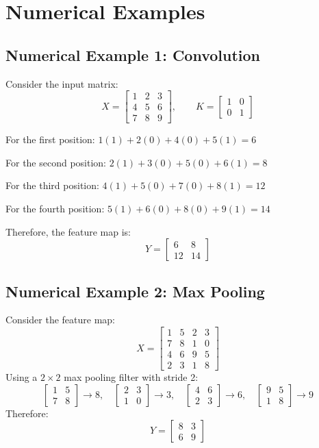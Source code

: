 \documentclass[11pt]{article}
\begin{document}
\section{Numerical Examples}

\subsection{Numerical Example 1: Convolution}
Consider the input matrix:
\[
X = \begin{bmatrix} 1 & 2 & 3 \\ 4 & 5 & 6 \\ 7 & 8 & 9 \end{bmatrix}, \qquad
K = \begin{bmatrix} 1 & 0 \\ 0 & 1 \end{bmatrix}
\]

For the first position: $1(1) + 2(0) + 4(0) + 5(1) = 6$

For the second position: $2(1) + 3(0) + 5(0) + 6(1) = 8$

For the third position: $4(1) + 5(0) + 7(0) + 8(1) = 12$

For the fourth position: $5(1) + 6(0) + 8(0) + 9(1) = 14$

Therefore, the feature map is:
\[
Y = \begin{bmatrix} 6 & 8 \\ 12 & 14 \end{bmatrix}
\]

\subsection{Numerical Example 2: Max Pooling}
Consider the feature map:
\[
X = \begin{bmatrix} 1 & 5 & 2 & 3 \\ 7 & 8 & 1 & 0 \\ 4 & 6 & 9 & 5 \\ 2 & 3 & 1 & 8 \end{bmatrix}
\]
Using a $2 \times 2$ max pooling filter with stride 2:
\[
\begin{bmatrix} 1 & 5 \\ 7 & 8 \end{bmatrix} \rightarrow 8, \quad
\begin{bmatrix} 2 & 3 \\ 1 & 0 \end{bmatrix} \rightarrow 3, \quad
\begin{bmatrix} 4 & 6 \\ 2 & 3 \end{bmatrix} \rightarrow 6, \quad
\begin{bmatrix} 9 & 5 \\ 1 & 8 \end{bmatrix} \rightarrow 9
\]
Therefore:
\[
Y = \begin{bmatrix} 8 & 3 \\ 6 & 9 \end{bmatrix}
\]
\end{document}
